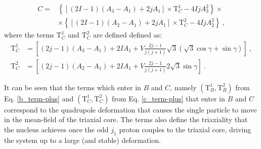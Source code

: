 \documentclass[11pt]{article}
\begin{document}
\begin{align}
    C=&\left\{\left[(2I-1)(A_3-A_1)+2jA_1\right]\times\text{T}_C^1
- 4IjA_3^2\right \}\times \nonumber\\
      &\times\left\{\left[(2I-1)(A_2-A_1)+2jA_1\right]\times\text{T}_C^2-4IjA_2^2\right\}\ ,
      \label{c_term}
\end{align}
where the terms $\text{T}_C^1$ and $\text{T}_C^2$ are defined defined as:
\begin{align}
    \text{T}_C^1&=\left[(2j-1)(A_3-A_1)+2IA_1+V\frac{2j-1}{j(j+1)}\sqrt{3}(\sqrt{3}\cos\gamma+\sin\gamma)\right]\ , \nonumber\\
    \text{T}_C^2&=\left[(2j-1)(A_2-A_1)+2IA_1+V\frac{2j-1}{j(j+1)}2\sqrt{3}\sin\gamma\right]\ . 
    \label{c_term-plus}
\end{align}

It can be seen that the terms which enter in $B$ and $C$, namely $(\text{T}_B^1,\text{T}_B^2)$ from Eq. \ref{b_term-plus} and $(\text{T}_C^1,\text{T}_C^2)$ from Eq. \ref{c_term-plus} that enter in $B$ and $C$ correspond to the quadrupole deformation that causes the single particle to move in the mean-field of the triaxial core. The terms also define the triaxiality that the nucleus achieves once the odd $j_1$ proton couples to the triaxial core, driving the system up to a large (and stable) deformation.




\end{document}
